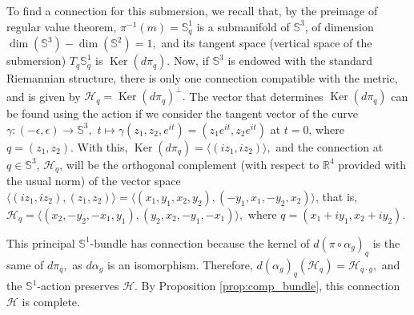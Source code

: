 \documentclass[12pt, letterpaper, reqno]{amsart}
\theoremstyle{definition}
\theoremstyle{plain}
\theoremstyle{remark}
\begin{document}
	To find a connection for this submersion, we recall that, by the preimage of regular value theorem, $ \pi^{-1}(m) = \mathbb{S}^1_q $ is a submanifold of $ \mathbb{S}^3 $, of dimension $ \operatorname{dim}( \mathbb{S}^3)- \operatorname{dim}( \mathbb{S}^2) = 1,  $ and its tangent space (vertical space of the submersion) $ T_q \mathbb{S}^1_q $ is $ \operatorname{Ker}(d\pi_q)  $. Now, if $ \mathbb{S}^3 $ is endowed with the standard Riemannian structure, there is only one connection compatible with the metric, and is given by $ \mathcal{H}_q = \operatorname{Ker}(d\pi_q)^\perp. $ The vector that determines $ \operatorname{Ker}(d\pi_q)  $ can be found using the action if we consider the tangent vector of the curve $ \gamma: (-\epsilon, \epsilon) \rightarrow \mathbb{S}^3, $ $ t\mapsto \gamma(z_1,z_2, e^{it})=(z_1e^{it},z_2e^{it}) $ at $ t=0 $, where $ q=(z_1,z_2). $ With this, $ \operatorname{Ker}(d\pi_q) = \langle(iz_1, iz_2)\rangle,  $ and the connection at $ q\in \mathbb{S}^3 $,  $ \mathcal{H}_q $, will be the orthogonal complement (with respect to $ \mathbb{R}^4 $ provided with the usual norm) of the vector space $ \langle(iz_1,iz_2), (z_1,z_2)\rangle  {= \langle(x_1,y_1,x_2,y_2), (-y_1,x_1,-y_2,x_2)\rangle}$, that is, $ \mathcal{H}_q = \langle(x_2,-y_2,-x_1,y_1),(y_2,x_2,-y_1,-x_1)\rangle, $ where $ q=(x_1+iy_1, x_2+iy_2). $   

	This principal $ \mathbb{S}^1$-bundle has connection because the kernel of $ d(\pi\circ \alpha_g)_q $ is the same of $ d\pi_q, $ as $ d\alpha_g $ is an isomorphism. Therefore, $ d(\alpha_g)_q ( \mathcal{H}_q) = \mathcal{H}_{q\cdot g}, $ and the $ \mathbb{S}^1 $-action preserves $ \mathcal{H}. $ By Proposition \ref{prop:comp_bundle}, this connection $ \mathcal{H} $ is complete.  
 
\end{document}
